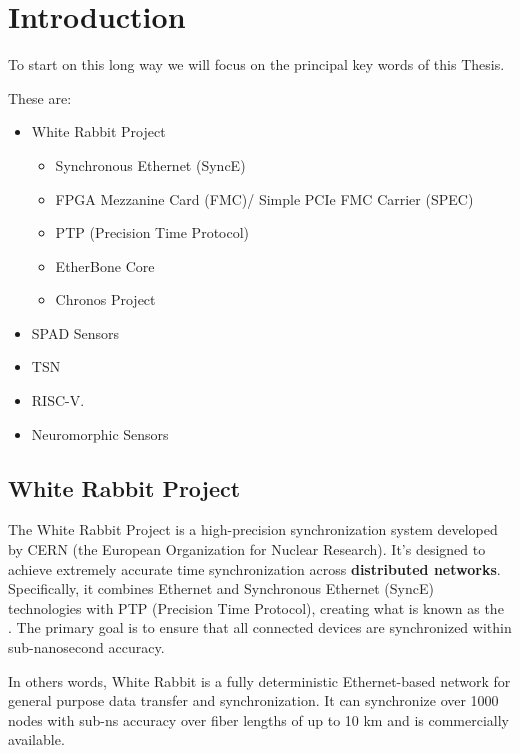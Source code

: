 \section{Introduction}

\label{intro}

To start on this long way we will focus on the principal key words of this Thesis.

\vspace{5 mm}

\noindent These are: 

\begin{itemize}
\item White Rabbit Project
\begin{itemize}
\item Synchronous Ethernet (SyncE) 
\item FPGA Mezzanine Card (FMC)/ Simple PCIe FMC Carrier (SPEC)
\item PTP (Precision Time Protocol) 
\item EtherBone Core
\item Chronos Project
\end{itemize}
\item SPAD Sensors
\item TSN
\item RISC-V.
\item Neuromorphic Sensors
\end{itemize}

\subsection{White Rabbit Project}

The White Rabbit Project \cite{white-rabbit} is a high-precision synchronization system developed by CERN (the European Organization for Nuclear Research).
It’s designed to achieve extremely accurate time synchronization across \textbf{distributed networks}. 
Specifically, it combines Ethernet and Synchronous Ethernet (SyncE) technologies with PTP (Precision Time Protocol), creating what is known as the .
The primary goal is to ensure that all connected devices are synchronized within sub-nanosecond accuracy.

\vspace{5 mm}

\noindent In others words, White Rabbit \cite{WR:ohwr} is a fully deterministic Ethernet-based network for general purpose data transfer and synchronization. 
It can synchronize over 1000 nodes with sub-ns accuracy over fiber lengths of up to 10 km and is commercially available.

